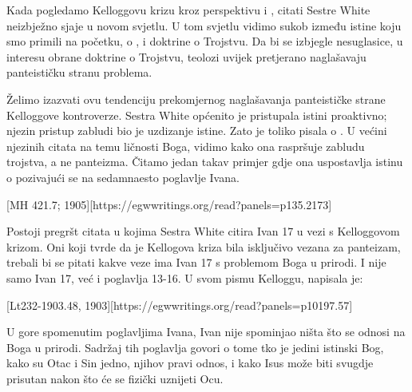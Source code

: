 
Kada pogledamo Kelloggovu krizu kroz perspektivu  i , citati Sestre White neizbježno sjaje u novom svjetlu. U tom svjetlu vidimo sukob između istine koju smo primili na početku, o , i doktrine o Trojstvu. Da bi se izbjegle nesuglasice, u interesu obrane doktrine o Trojstvu, teolozi uvijek pretjerano naglašavaju panteističku stranu problema.

Želimo izazvati ovu tendenciju prekomjernog naglašavanja panteističke strane Kelloggove kontroverze. Sestra White općenito je pristupala istini proaktivno; njezin pristup zabludi bio je uzdizanje istine. Zato je toliko pisala o . U većini njezinih citata na temu ličnosti Boga, vidimo kako ona raspršuje zabludu trojstva, a ne panteizma. Čitamo jedan takav primjer gdje ona uspostavlja istinu o  pozivajući se na sedamnaesto poglavlje Ivana.

[MH 421.7; 1905][https://egwwritings.org/read?panels=p135.2173]

Postoji pregršt citata u kojima Sestra White citira Ivan 17 u vezi s Kelloggovom krizom. Oni koji tvrde da je Kellogova kriza bila isključivo vezana za panteizam, trebali bi se pitati kakve veze ima Ivan 17 s problemom Boga u prirodi. I nije samo Ivan 17, već i poglavlja 13-16. U svom pismu Kelloggu, napisala je:

[Lt232-1903.48, 1903][https://egwwritings.org/read?panels=p10197.57]

U gore spomenutim poglavljima Ivana, Ivan nije spominjao ništa što se odnosi na Boga u prirodi. Sadržaj tih poglavlja govori o tome tko je jedini istinski Bog, kako su Otac i Sin jedno, njihov pravi odnos, i kako Isus može biti svugdje prisutan nakon što će se fizički uznijeti Ocu.

